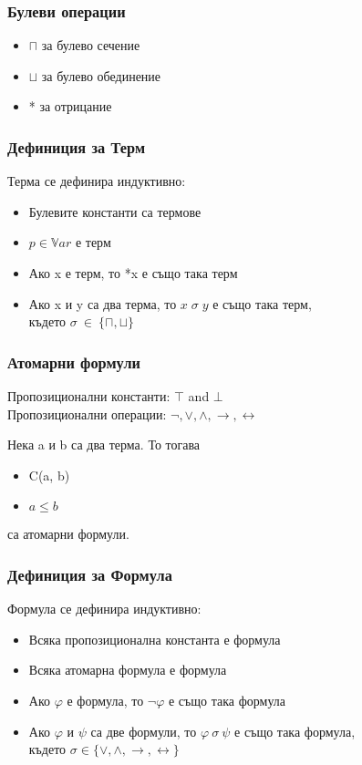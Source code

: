 \documentclass{beamer}
\begin{document}
\begin{frame}\frametitle{Булеви операции}
	\begin{itemize}
		\item $\sqcap$ за булево сечение
		\item $\sqcup$ за булево обединение
		\item * за отрицание
	\end{itemize}
\end{frame}

\begin{frame}\frametitle{Дефиниция за Терм}
Терма се дефинира индуктивно:
	\begin{itemize}
		\item Булевите константи са термове
		\item $p \in \mathbb{V}ar$ е терм
		\item Ако x е терм, то *x е също така терм
		\item Ако x и y са два терма, то $x \; \sigma \; y $ е също така терм,\\
				където $\sigma \: \in \: \{\sqcap, \sqcup\}$
	\end{itemize}
\end{frame}

\begin{frame}\frametitle{Атомарни формули}
	Пропозиционални константи: $\top$ and $\bot$ \\
	\vspace{10px}
	Пропозиционални операции: $\neg, \vee, \wedge, \rightarrow, \leftrightarrow$
	\vspace{10px}

	Нека a и b са два терма. То тогава 
	\begin{itemize}
		\item C(a, b)
		\item $a \le b$
	\end{itemize}
	са атомарни формули.
\end{frame}

\begin{frame}\frametitle{Дефиниция за Формула}
Формула се дефинира индуктивно:
		\begin{itemize}
			\item Всяка пропозиционална константа е формула
			\item Всяка атомарна формула е формула
			\item Ако $\varphi$ е формула, то $\neg{\varphi}$ е също така формула
			\item Ако $\varphi$ и $\psi$ са две формули, то $\varphi \: \sigma \: \psi $ е също така формула,\\
				където $\sigma \in \{\vee, \wedge, \rightarrow, \leftrightarrow\}$
		\end{itemize}
\end{frame}
\end{document}

